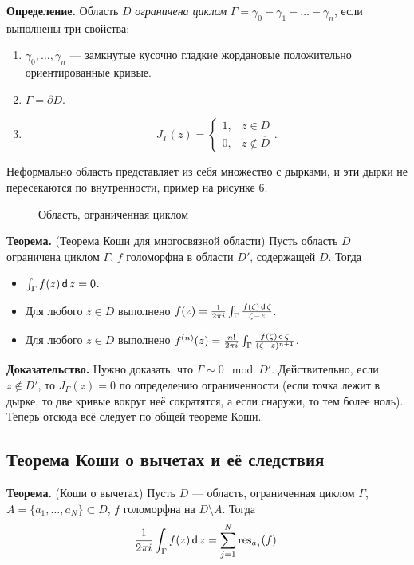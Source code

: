 \textbf{Определение.} Область $D$ \textit{ограничена циклом} $\Gamma = \gamma_0 - \gamma_1 - \dots - \gamma_n$, если выполнены три свойства:
\begin{enumerate}
    \item $\gamma_0, \dots, \gamma_n$ --- замкнутые кусочно гладкие жордановые положительно ориентированные кривые.
    \item $\Gamma = \partial D$.
    \item
        \[
            J_\Gamma(z) =
            \begin{cases}
                1, & z \in D \\
                0, & z \not\in \overline D
            \end{cases} .
        \]
\end{enumerate}

Неформально область представляет из себя множество с дырками, и эти дырки не пересекаются по внутренности, пример на рисунке 6.

\begin{figure}[ht]
    \centering
    \caption{Область, ограниченная циклом}
\end{figure}

\textbf{Теорема.} (Теорема Коши для многосвязной области) Пусть область $D$ ограничена циклом $\Gamma$, $f$ голоморфна в области $D'$, содержащей $\overline D$.
Тогда
\begin{itemize}
    \item $\int_\Gamma f(z) \operatorname{\mathsf d} z = 0$.
    \item Для любого $z \in D$ выполнено $f(z) = \frac{1}{2\pi i} \int_\Gamma \frac{f(\zeta) \operatorname{\mathsf d} \zeta}{\zeta - z}$.
    \item Для любого $z \in D$ выполнено $f^{(n)}(z) = \frac{n!}{2\pi i} \int_\Gamma \frac{f(\zeta) \operatorname{\mathsf d} \zeta}{(\zeta - z)^{n+1}}$.
\end{itemize}

\textbf{Доказательство.} Нужно доказать, что $\Gamma \sim 0 \mod D'$.
Действительно, если $z \not\in D'$, то $J_\Gamma(z) = 0$ по определению ограниченности (если точка лежит в дырке, то две кривые вокруг неё сократятся, а если снаружи, то тем более ноль).
Теперь отсюда всё следует по общей теореме Коши.

\QED

\subsection{Теорема Коши о вычетах и её следствия}
\textbf{Теорема.} (Коши о вычетах) Пусть $D$ --- область, ограниченная циклом $\Gamma$, $A = \{a_1, \dots, a_N\} \subset D$, $f$ голоморфна на $D \setminus A$.
Тогда
\[
    \frac{1}{2\pi i} \int_\Gamma f(z) \operatorname{\mathsf d} z = \sum_{j=1}^{N} \operatorname{res}_{a_j} (f).
\]

